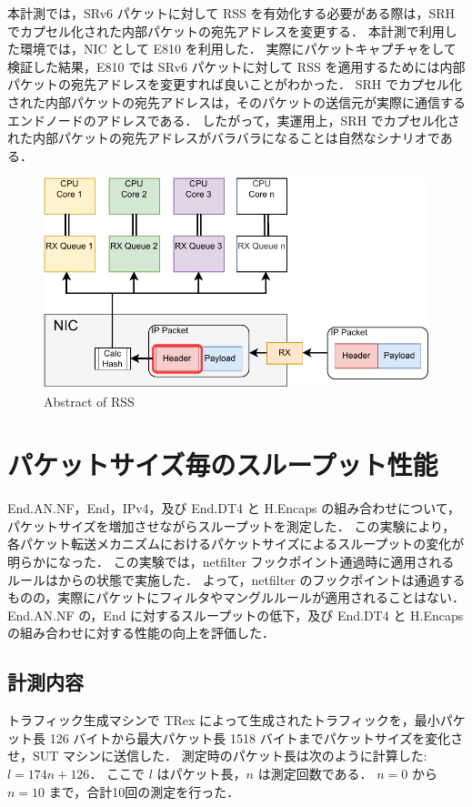 本計測では，SRv6 パケットに対して RSS を有効化する必要がある際は，SRH でカプセル化された内部パケットの宛先アドレスを変更する．
本計測で利用した環境では，NIC として E810 を利用した．
実際にパケットキャプチャをして検証した結果，E810 では SRv6 パケットに対して RSS を適用するためには内部パケットの宛先アドレスを変更すれば良いことがわかった．
SRH でカプセル化された内部パケットの宛先アドレスは，そのパケットの送信元が実際に通信するエンドノードのアドレスである．
したがって，実運用上，SRH でカプセル化された内部パケットの宛先アドレスがバラバラになることは自然なシナリオである．


\begin{figure}[t]
    \centering
    \includegraphics[width=0.95\linewidth]{img/RSS.pdf}
    \caption{Abstract of RSS}
    \label{fig:rss}
\end{figure}

\section{パケットサイズ毎のスループット性能}
\label{sec:eval.thru-size}
End.AN.NF，End，IPv4，及び End.DT4 と H.Encaps の組み合わせについて，パケットサイズを増加させながらスループットを測定した．
この実験により，各パケット転送メカニズムにおけるパケットサイズによるスループットの変化が明らかになった．
この実験では，netfilter フックポイント通過時に適用されるルールはからの状態で実施した．
よって，netfilter のフックポイントは通過するものの，実際にパケットにフィルタやマングルルールが適用されることはない．
End.AN.NF の，End に対するスループットの低下，及び End.DT4 と H.Encaps の組み合わせに対する性能の向上を評価した．

\subsection{計測内容}
\label{ssec:thru-size.summary}
トラフィック生成マシンで TRex によって生成されたトラフィックを，最小パケット長 126 バイトから最大パケット長 1518 バイトまでパケットサイズを変化させ，SUT マシンに送信した．
測定時のパケット長は次のように計算した: $l=174n+126$．
ここで $l$ はパケット長，$n$ は測定回数である．
$n=0$ から $n=10$ まで，合計10回の測定を行った．

